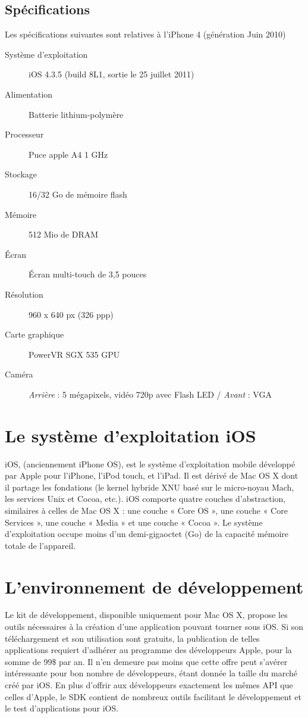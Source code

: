 \documentclass[a4paper,12pt]{report}
\begin{document}
\begin{onehalfspace}
\subsection{Spécifications}
Les spécifications suivantes sont relatives à l'iPhone 4 (génération Juin 2010)
	\begin{description}
	\item[Système d'exploitation] iOS 4.3.5 (build 8L1, sortie le 25 juillet 2011)
	\item[Alimentation] Batterie lithium-polymère
	\item[Processeur] Puce apple A4 1 GHz
	\item[Stockage]	16/32 Go de mémoire flash
	\item[Mémoire] 512 Mio de DRAM
	\item[Écran] Écran multi-touch de 3,5 pouces
	\item[Résolution] 960 x 640 px (326 ppp)
	\item[Carte graphique]	PowerVR SGX 535 GPU
	\item[Caméra] \emph{Arrière} : 5 mégapixels, vidéo 720p avec Flash LED / \emph{Avant} : VGA
	\end{description}

\section{Le système d'exploitation iOS}
iOS, (anciennement iPhone OS), est le système d'exploitation mobile développé par Apple pour l'iPhone, l'iPod touch, et l'iPad. Il est dérivé de Mac OS X dont il partage les fondations (le kernel hybride XNU basé sur le micro-noyau Mach, les services Unix et Cocoa, etc.). iOS comporte quatre couches d'abstraction, similaires à celles de Mac OS X : une couche « Core OS », une couche « Core Services », une couche « Media » et une couche « Cocoa ». Le système d'exploitation occupe moins d'un demi-gigaoctet (Go) de la capacité mémoire totale de l'appareil.

\section{L'environnement de développement}
Le kit de développement, disponible uniquement pour Mac OS X, propose les outils nécessaires à la création d'une application pouvant tourner sous iOS. Si son téléchargement et son utilisation sont gratuits, la publication de telles applications requiert d'adhérer au programme des développeurs Apple, pour la somme de 99\$ par an. Il n'en demeure pas moins que cette offre peut s'avérer intéressante pour bon nombre de développeurs, étant donnée la taille du marché créé par iOS.
En plus d'offrir aux développeurs exactement les mêmes API que celles d'Apple, le SDK contient de nombreux outils facilitant le développement et le test d'applications pour iOS.


\end{onehalfspace}
\end{document}
